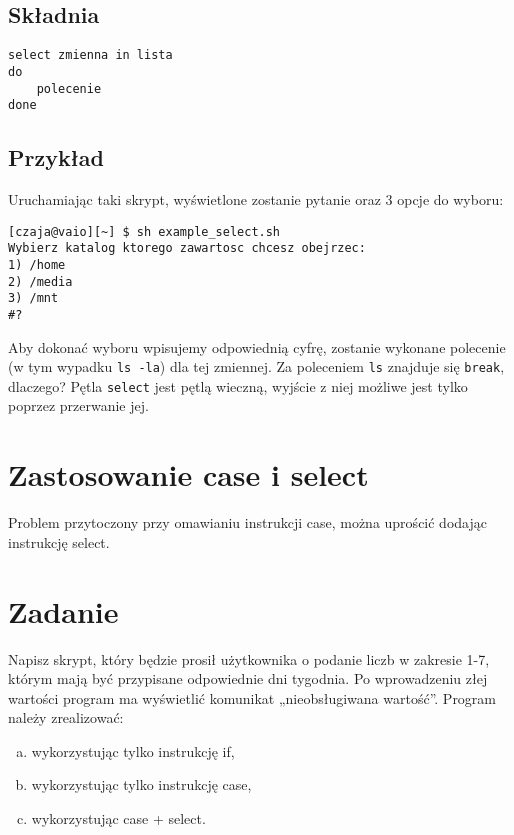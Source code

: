 \subsection{Składnia}

\begin{lstlisting}
select zmienna in lista
do
	polecenie
done
\end{lstlisting}

\subsection{Przykład}


Uruchamiając taki skrypt, wyświetlone zostanie pytanie oraz 3 opcje do wyboru: \newline
\begin{verbatim}
[czaja@vaio][~] $ sh example_select.sh
Wybierz katalog ktorego zawartosc chcesz obejrzec:
1) /home
2) /media
3) /mnt
#?
\end{verbatim}
Aby dokonać wyboru wpisujemy odpowiednią cyfrę, zostanie wykonane polecenie (w tym
wypadku \texttt{ls -la}) dla tej zmiennej. Za poleceniem \texttt{ls} znajduje się \texttt{break}, dlaczego? Pętla \texttt{select} jest pętlą wieczną, wyjście z niej możliwe jest tylko poprzez przerwanie jej.
 
\section{Zastosowanie case i select}
Problem przytoczony przy omawianiu instrukcji case, można uprościć dodając instrukcję select. \newline


\section{Zadanie}
Napisz skrypt, który będzie prosił użytkownika o podanie liczb w zakresie 1-7, którym mają być przypisane  odpowiednie dni tygodnia. Po wprowadzeniu złej wartości program ma wyświetlić komunikat „nieobsługiwana wartość”. Program należy zrealizować:
\begin{enumerate}[a)]
\item wykorzystując tylko instrukcję if,
\item wykorzystując tylko instrukcję case,
\item wykorzystując case + select.
\end{enumerate}